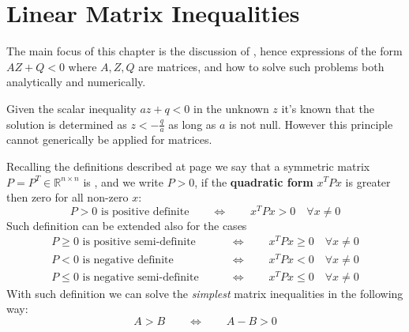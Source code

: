 \chapter{Linear Matrix Inequalities}
	The main focus of this chapter is the discussion of , hence expressions of the form $A Z + Q < 0$ where $A,Z,Q$ are matrices, and how to solve such problems both analytically and numerically.
	
	Given the scalar inequality $a z + q<0$ in the unknown $z$ it's known that the solution is determined as $z < - \frac q a$ as long as $a$ is not null. However this principle cannot generically be applied for matrices.
	
	Recalling the definitions described at page \pageref{sec:positivedefinite} we say that a symmetric matrix $P = P^T \in \mathds R^{n\times n}$ is , and we write $P>0$, if the \textbf{quadratic form} $x^TPx$ is greater then zero for all non-zero $x$:
	\[ P > 0\textrm{ is positive definite} \qquad \Leftrightarrow \qquad x^T P x > 0 \quad \forall x \neq 0 \]
	Such definition can be extended also for the cases
	\begin{align*}
		P \geq 0\textrm{ is positive semi-definite} \qquad & \Leftrightarrow \qquad x^T P x \geq 0 \quad \forall x \neq 0 \\
		P < 0 \textrm{ is negative definite} \qquad & \Leftrightarrow \qquad x^T P x < 0 \quad \forall x \neq 0 \\
		P \leq 0 \textrm{ is negative semi-definite} \qquad & \Leftrightarrow \qquad x^T P x \leq 0 \quad \forall x \neq 0
	\end{align*}
	With such definition we can solve the \textit{simplest} matrix inequalities in the following way:
	\[ A > B \qquad \Leftrightarrow \qquad A - B > 0 \]
	
